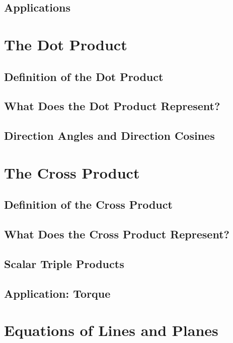 \documentclass{package/notes}
\begin{document}
\subsection{Applications}



\section{The Dot Product}

\subsection{Definition of the Dot Product}

\subsection{What Does the Dot Product Represent?}

\subsection{Direction Angles and Direction Cosines}



\section{The Cross Product}

\subsection{Definition of the Cross Product}

\subsection{What Does the Cross Product Represent?}

\subsection{Scalar Triple Products}

\subsection{Application: Torque}




\section{Equations of Lines and Planes}
\end{document}
